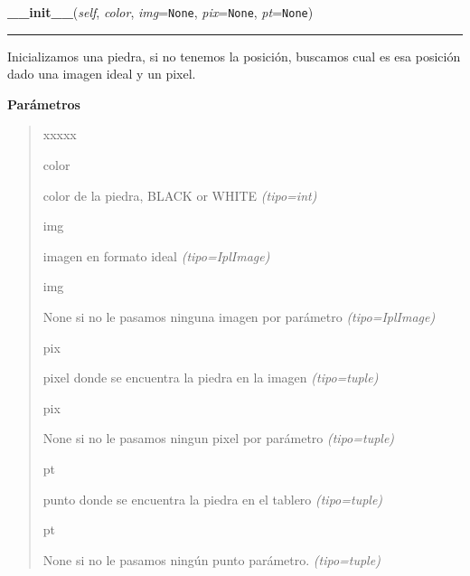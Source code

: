 \hspace{.8\funcindent}\begin{boxedminipage}{\funcwidth}

    \raggedright \textbf{\_\_init\_\_}(\textit{self}, \textit{color}, \textit{img}={\tt None}, \textit{pix}={\tt None}, \textit{pt}={\tt None})

    \vspace{-1.5ex}

    \rule{\textwidth}{0.5\fboxrule}
\setlength{\parskip}{2ex}
Inicializamos una piedra, si no tenemos la posición, buscamos cual es esa posición dado una imagen ideal y un pixel.

\setlength{\parskip}{1ex}
      \textbf{Parámetros}
      \vspace{-1ex}

      \begin{quote}
        \begin{Ventry}{xxxxx}

          \item[color]


color de la piedra, BLACK or WHITE
            {\it (tipo=int)}

          \item[img]


imagen en formato ideal
            {\it (tipo=IplImage)}

          \item[img]


None si no le pasamos ninguna imagen por parámetro
            {\it (tipo=IplImage)}

          \item[pix]


pixel donde se encuentra la piedra en la imagen
            {\it (tipo=tuple)}

          \item[pix]


None si no le pasamos ningun pixel por parámetro
            {\it (tipo=tuple)}

          \item[pt]


punto donde se encuentra la piedra en el tablero
            {\it (tipo=tuple)}

          \item[pt]


None si no le pasamos ningún punto parámetro.
            {\it (tipo=tuple)}

        \end{Ventry}

      \end{quote}

    \end{boxedminipage}

